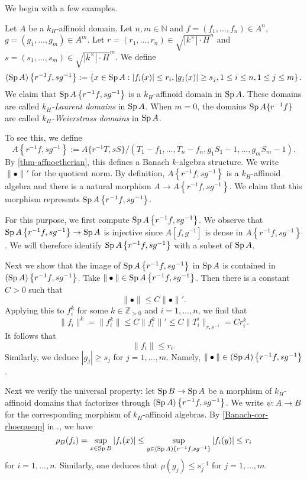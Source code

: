 We begin with a few examples.
\begin{example}\label{ex-Laurentdomain}
    Let $A$ be a $k_H$-affinoid domain.
    Let $n,m\in \mathbb{N}$ and $f=(f_1,\ldots,f_n)\in A^n$, $g=(g_1,\ldots,g_m)\in A^m$. Let $r=(r_1,\ldots,r_n)\in\sqrt{|k^{\times}|\cdot H}^n$ and $s=(s_1,\ldots,s_m)\in \sqrt{|k^{\times}|\cdot H}^m$. We define
    \[
        (\operatorname{Sp} A)\left\{r^{-1}f,sg^{-1}\right\}:=\left\{x\in \operatorname{Sp} A: |f_i(x)|\leq r_i, |g_j(x)|\geq s_j, 1\leq i\leq n, 1\leq j\leq m\right\}.  
    \]
    We claim that $\operatorname{Sp} A\left\{r^{-1}f,sg^{-1}\right\}$ is a $k_H$-affinoid domain in $\operatorname{Sp} A$. These domains are called \emph{$k_H$-Laurent domains} in $\operatorname{Sp} A$. When $m=0$, the domains $\operatorname{Sp} A\{r^{-1}f\}$ are called \emph{$k_H$-Weierstrass domains} in $\operatorname{Sp} A$.

    To see this, we define
    \[
        A\left\{r^{-1}f,sg^{-1}\right\}:=A\{r^{-1}T,sS\}/(T_1-f_1,\ldots,T_n-f_n,g_1S_1-1,\ldots,g_mS_m-1).
    \]
    By \cref{thm-affnoetherian}, this defines a Banach $k$-algebra structure.
    We write $\|\bullet\|'$ for the quotient norm.
    By definition, $A\left\{r^{-1}f,sg^{-1}\right\}$ is a $k_H$-affinoid algebra and there is a natural morphism $A\rightarrow A\left\{r^{-1}f,sg^{-1}\right\}$. We claim that this morphism represents $\operatorname{Sp} A\left\{r^{-1}f,sg^{-1}\right\}$.

    For this purpose, we first compute $\operatorname{Sp} A\left\{r^{-1}f,sg^{-1}\right\}$. We observe that $\operatorname{Sp} A\left\{r^{-1}f,sg^{-1}\right\}\rightarrow \operatorname{Sp} A$ is injective since
    $A[f,g^{-1}]$ is dense in $A\left\{r^{-1}f,sg^{-1}\right\}$. We will therefore identify $\operatorname{Sp} A\left\{r^{-1}f,sg^{-1}\right\}$ with a subset of $\operatorname{Sp} A$. 
    
    Next we show that the image of $\operatorname{Sp} A\left\{r^{-1}f,sg^{-1}\right\}$ in $\operatorname{Sp} A$ is contained in $(\operatorname{Sp} A)\left\{r^{-1}f,sg^{-1}\right\}$. Take $\|\bullet\|\in \operatorname{Sp} A\left\{r^{-1}f,sg^{-1}\right\}$. Then there is a constant $C>0$ such that
    \[
        \|\bullet\|\leq C\|\bullet\|'.  
    \]
    Applying this to $f^k_i$ for some $k\in \mathbb{Z}_{>0}$ and $i=1,\ldots,n$, we find that
    \[
        \|f_i\|^k=\|f_i^k\|\leq C\|f_i^k\|'\leq C\|T_i^i\|_{r,s^{-1}}= Cr_i^{k}.  
    \]
    It follows that 
    \[
        \|f_i\|\leq r_i.
    \]
    Similarly, we deduce $|g_j|\geq s_j$ for $j=1,\ldots,m$. Namely, $\|\bullet\|\in (\operatorname{Sp} A)\left\{r^{-1}f,sg^{-1}\right\}$.


    Next we verify the universal property: let $\operatorname{Sp} B\rightarrow \operatorname{Sp} A$ be a morphism of $k_H$-affinoid domains that factorizes through $(\operatorname{Sp} A)\left\{r^{-1}f,sg^{-1}\right\}$. We write $\psi:A\rightarrow B$ for the corresponding morphism of $k_H$-affinoid algebras.
    By \cref{Banach-cor-rhoequsup} in ., we have
    \[
        \rho_B(f_i)=\sup_{x\in \operatorname{Sp} B}|f_i(x)|\leq \sup_{y\in (\operatorname{Sp} A)\left\{r^{-1}f,sg^{-1}\right\}} |f_i(y)|\leq r_i
    \]   
    for $i=1,\ldots,n$. Similarly, one deduces that $\rho(g_j)\leq s_j^{-1}$ for $j=1,\ldots,m$.
    

\end{example}
